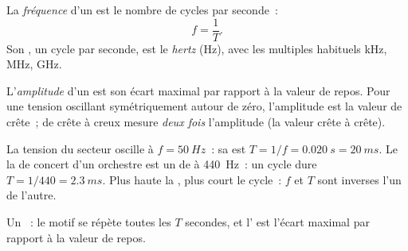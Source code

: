 \begin{definition}[Fréquence]\label{def:g10:signals-and-waves:frequency}
La \emph{fréquence} d'un 
est le nombre de cycles par seconde~:
\[
f = \frac{1}{T} .
\]
Son , un cycle par seconde, est le \emph{hertz}
(\unit{Hz}), avec les multiples habituels \unit{kHz}, \unit{MHz},
\unit{GHz}.
\end{definition}

\begin{definition}[Amplitude]\label{def:g10:signals-and-waves:amplitude}
L'\emph{amplitude} d'un 
est son écart maximal par rapport à la valeur de repos. Pour une tension
oscillant symétriquement autour de zéro, l'amplitude est la valeur de
crête~; de crête à creux mesure \emph{deux fois} l'amplitude (la valeur
crête à crête).
\end{definition}

\begin{example}\label{ex:g10:signals-and-waves:mains}
La tension du secteur oscille à $f = \qty{50}{Hz}$~: sa
 est $T = 1/f = \qty{0.020}{s} = \qty{20}{ms}$.
Le la de concert d'un orchestre est un  de
 à \qty{440}{Hz}~: un cycle dure
$T = 1/440 = \qty{2.3}{ms}$. Plus haute la
, plus court le cycle~: $f$ et $T$ sont
inverses l'un de l'autre.
\end{example}

\begin{omfigure}

{\small Un ~: le motif se répète toutes les
$T$ secondes, et l' est l'écart maximal par
rapport à la valeur de repos.}
\end{omfigure}

